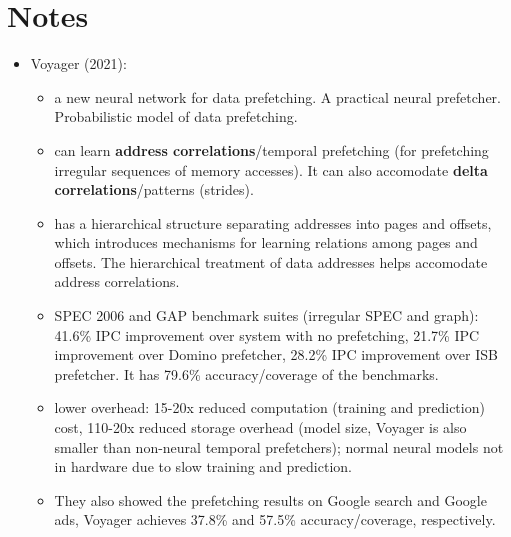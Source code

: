 \documentclass [12pt]{article}
\begin{document}
    \section{Notes}
        \begin{itemize}
            \item Voyager (2021): 
                \begin{itemize}
                    \item a new neural network for data prefetching. A practical neural prefetcher. Probabilistic model of data prefetching. 
                    \item can learn \textbf{address correlations}/temporal prefetching (for prefetching irregular sequences of memory accesses). It can also accomodate \textbf{delta correlations}/patterns (strides).
                    \item has a hierarchical structure separating addresses into pages and offsets, which introduces mechanisms for learning relations among pages and offsets. The hierarchical treatment of data addresses helps accomodate address correlations.
                    \item SPEC 2006 and GAP benchmark suites (irregular SPEC and graph): 41.6\% IPC improvement over system with no prefetching, 21.7\% IPC improvement over Domino prefetcher, 28.2\% IPC improvement over ISB prefetcher. It has 79.6\% accuracy/coverage of the benchmarks.
                    \item lower overhead: 15-20x reduced computation (training and prediction) cost, 110-20x reduced storage overhead (model size, Voyager is also smaller than non-neural temporal prefetchers); normal neural models not in hardware due to slow training and prediction.
                    \item They also showed the prefetching results on Google search and Google ads, Voyager achieves 37.8\% and 57.5\% accuracy/coverage, respectively.
                \end{itemize}


\end{itemize}
\end{document}
